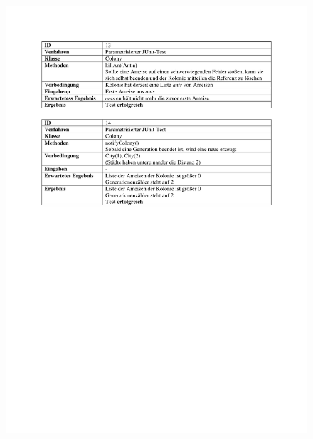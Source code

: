 \begin{appendices}
\begin{figure}[h]
		\includegraphics[width=\linewidth]{images/Testfaelle_Colony_Seite_2.pdf}
		\label{testColony2}
	\end{figure}


\end{appendices}
